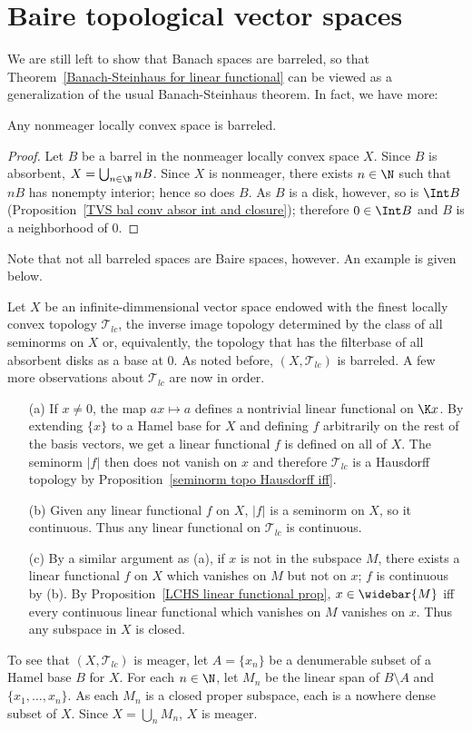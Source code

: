 \section{Baire topological vector spaces}
We are still left to show that Banach spaces are barreled, so that Theorem~\ref{Banach-Steinhaus for linear functional} can be viewed as a generalization of the usual Banach-Steinhaus theorem. In fact, we have more:
\begin{proposition}\label{LCS nonmeager is barreled}
Any nonmeager locally convex space is barreled.
\end{proposition}
\begin{proof}
Let $B$ be a barrel in the nonmeager locally convex space $X$. Since $B$ is absorbent, $X=\bigcup_{n\in\N}nB$. Since $X$ is nonmeager, there exists $n\in\N$ such that $nB$ has nonempty interior; hence so does $B$. As $B$ is a disk, however, so is $\Int B$ (Proposition~\ref{TVS bal conv absor int and closure}); therefore $0\in\Int B$ and $B$ is a neighborhood of $0$.
\end{proof}
Note that not all barreled spaces are Baire spaces, however. An example is given below.
\begin{example}\label{LCS finest LC topo barreled nonBaire}
Let $X$ be an infinite-dimmensional vector space endowed with the finest locally convex topology $\mathcal{T}_{lc}$, the inverse image topology determined by the class of all seminorms on $X$ or, equivalently, the topology that has the filterbase of all absorbent disks as a base at $0$. As noted before, $(X,\mathcal{T}_{lc})$ is barreled. A few more observations about $\mathcal{T}_{lc}$ are now in order.
\begin{itemize}
\item[(a)] If $x\neq 0$, the map $ax\mapsto a$ defines a nontrivial linear functional on $\K x$. By extending $\{x\}$ to a Hamel base for $X$ and defining $f$ arbitrarily on the rest of the basis vectors, we get a linear functional $f$ is defined on all of $X$. The seminorm $|f|$ then does not vanish on $x$ and therefore $\mathcal{T}_{lc}$ is a Hausdorff topology by Proposition~\ref{seminorm topo Hausdorff iff}.
\item[(b)] Given any linear functional $f$ on $X$, $|f|$ is a seminorm on $X$, so it continuous. Thus any linear functional on $\mathcal{T}_{lc}$ is continuous.
\item[(c)] By a similar argument as (a), if $x$ is not in the subspace $M$, there exists a linear functional $f$ on $X$ which vanishes on $M$ but not on $x$; $f$ is continuous by (b). By Proposition~\ref{LCHS linear functional prop}, $x\in\widebar{M}$ iff every continuous linear functional which vanishes on $M$ vanishes on $x$. Thus any subspace in $X$ is closed.
\end{itemize}
To see that $(X,\mathcal{T}_{lc})$ is meager, let $A=\{x_n\}$ be a denumerable subset of a Hamel base $B$ for $X$. For each $n\in\N$, let $M_n$ be the linear span of $B\setminus A$ and $\{x_1,\dots,x_n\}$. As each $M_n$ is a closed proper subspace, each is a nowhere dense subset of $X$. Since $X=\bigcup_nM_n$, $X$ is meager.
\end{example}
